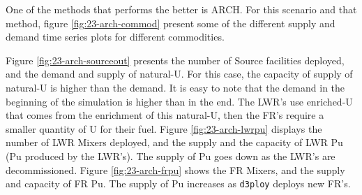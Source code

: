 \documentclass[11pt,letterpaper]{article}
\newcommand{\deploy}{\texttt{d3ploy}\xspace}%
\begin{document}
One of the methods that performs the better is ARCH. For this scenario and that method, figure \ref{fig:23-arch-commod} present some of the different supply and demand time series plots for different commodities.

Figure \ref{fig:23-arch-sourceout} presents the number of Source facilities deployed, and the demand and supply of natural-U. For this case, the capacity of supply of natural-U is higher than the demand. It is easy to note that the demand in the beginning of the simulation is higher than in the end. The LWR's use enriched-U that comes from the enrichment of this natural-U, then the FR's require a smaller quantity of U for their fuel. Figure \ref{fig:23-arch-lwrpu} displays the number of LWR Mixers deployed, and the supply and the capacity of LWR Pu (Pu produced by the LWR's). The supply of Pu goes down as the LWR's are decommissioned. Figure \ref{fig:23-arch-frpu} shows the FR Mixers, and the supply and capacity of FR Pu. The supply of Pu increases as \deploy deploys new FR's.
\end{document}
